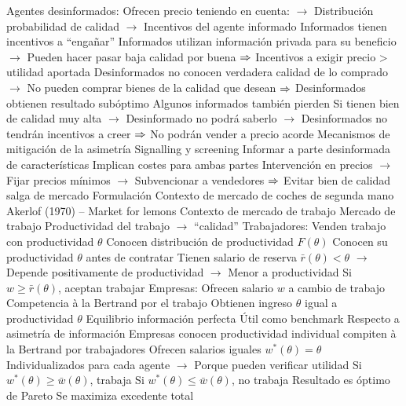 \documentclass{nuevotema}
\begin{document}
\begin{esquemal}
				\4 Agentes desinformados:
				\4[] Ofrecen precio teniendo en cuenta:
				\4[] $\to$ Distribución probabilidad de calidad
				\4[] $\to$ Incentivos del agente informado
				\4[$\then$] Informados tienen incentivos a ``engañar''
				\4[] Informados utilizan información privada para su beneficio
				\4[] $\to$ Pueden hacer pasar baja calidad por buena
				\4[] $\then$ Incentivos a exigir precio > utilidad aportada
				\4[] Desinformados no conocen verdadera calidad de lo comprado
				\4[] $\to$ No pueden comprar bienes de la calidad que desean
				\4[] $\then$ Desinformados obtienen resultado subóptimo
				\4[$\then$] Algunos informados también pierden
				\4[] Si tienen bien de calidad muy alta
				\4[] $\to$ Desinformado no podrá saberlo
				\4[] $\to$ Desinformados no tendrán incentivos a creer
				\4[] $\then$ No podrán vender a precio acorde
				\4 Mecanismos de mitigación de la asimetría
				\4[] Signalling y screening
				\4[] Informar a parte desinformada de características
				\4[] Implican costes para ambas partes
				\4[] Intervención en precios
				\4[] $\to$ Fijar precios mínimos
				\4[] $\to$ Subvencionar a vendedores
				\4[] $\then$ Evitar bien de calidad salga de mercado
		\2 Formulación
			\3 Contexto de mercado de coches de segunda mano
				\4 Akerlof (1970) -- Market for lemons
			\3 Contexto de mercado de trabajo
				\4 Mercado de trabajo
				\4[] Productividad del trabajo $\to$ ``calidad''
				\4 Trabajadores:
				\4[] Venden trabajo con productividad $\theta$
				\4[] Conocen distribución de productividad $F(\theta)$
				\4[] Conocen su productividad $\theta$ antes de contratar
				\4[] Tienen salario de reserva $\bar{r}(\theta) < \theta$
				\4[] $\to$ Depende positivamente de productividad
				\4[] $\to$ Menor a productividad
				\4[] Si $w \geq \bar{r}(\theta)$, aceptan trabajar
				\4 Empresas:
				\4[] Ofrecen salario $w$ a cambio de trabajo
				\4[] Competencia à la Bertrand por el trabajo
				\4[] Obtienen ingreso $\theta$ igual a productividad $\theta$
			\3 Equilibrio información perfecta
				\4 Útil como benchmark
				\4[] Respecto a asimetría de información
				\4 Empresas
				\4[] conocen productividad individual
				\4[] compiten à la Bertrand por trabajadores
				\4[$\then$] Ofrecen salarios iguales $w^*(\theta) = \theta$
				\4[] Individualizados para cada agente
				\4[] $\to$ Porque pueden verificar utilidad
				\4[$\to$] Si $w^*(\theta) \geq \bar{w}(\theta)$, trabaja
				\4[$\to$] Si $w^*(\theta) \leq \bar{w}(\theta)$, no trabaja
				\4[$\Rightarrow$] Resultado es óptimo de Pareto
				\4[] Se maximiza excedente total

\end{esquemal}
\end{document}
